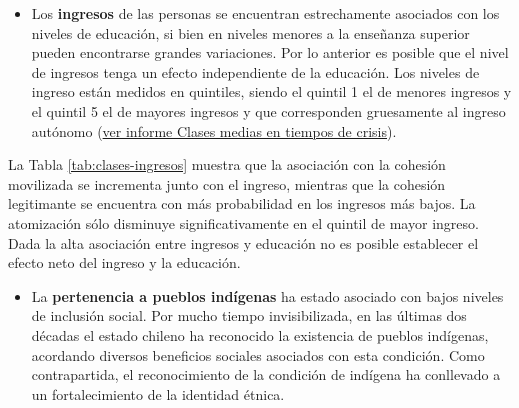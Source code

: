 \documentclass[
  12pt,
]{book}
\providecommand{\tightlist}{%
  \setlength{\itemsep}{0pt}\setlength{\parskip}{0pt}}
\begin{document}
\begin{itemize}
\tightlist
\item
  Los \textbf{ingresos} de las personas se encuentran estrechamente asociados con los niveles de educación, si bien en niveles menores a la enseñanza superior pueden encontrarse grandes variaciones. Por lo anterior es posible que el nivel de ingresos tenga un efecto independiente de la educación. Los niveles de ingreso están medidos en quintiles, siendo el quintil 1 el de menores ingresos y el quintil 5 el de mayores ingresos y que corresponden gruesamente al ingreso autónomo (\href{https://drive.google.com/file/d/12PsOPviSGwowOsxzvZn_vhwEoMbyMkl3/view}{ver informe Clases medias en tiempos de crisis}).
\end{itemize}

\begin{table}

\caption{\label{tab:clases-ingresos}Efecto de los quintiles de ingreso sobre los perfiles de cohesión social en porcentaje}
\centering
{}
\end{table}

La Tabla \ref{tab:clases-ingresos} muestra que la asociación con la cohesión movilizada se incrementa junto con el ingreso, mientras que la cohesión legitimante se encuentra con más probabilidad en los ingresos más bajos. La atomización sólo disminuye significativamente en el quintil de mayor ingreso. Dada la alta asociación entre ingresos y educación no es posible establecer el efecto neto del ingreso y la educación.

\begin{itemize}
\tightlist
\item
  La \textbf{pertenencia a pueblos indígenas} ha estado asociado con bajos niveles de inclusión social. Por mucho tiempo invisibilizada, en las últimas dos décadas el estado chileno ha reconocido la existencia de pueblos indígenas, acordando diversos beneficios sociales asociados con esta condición. Como contrapartida, el reconocimiento de la condición de indígena ha conllevado a un fortalecimiento de la identidad étnica.
\end{itemize}
\end{document}
